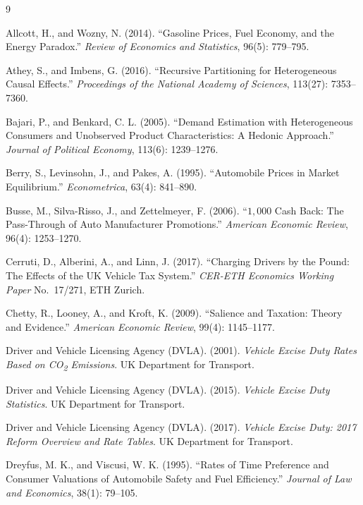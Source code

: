 \documentclass[12pt, a4paper]{article}
\begin{document}
\begin{thebibliography}{9}

Allcott, H., and Wozny, N. (2014).
``Gasoline Prices, Fuel Economy, and the Energy Paradox.''
\textit{Review of Economics and Statistics}, 96(5): 779--795.

Athey, S., and Imbens, G. (2016).
``Recursive Partitioning for Heterogeneous Causal Effects.''
\textit{Proceedings of the National Academy of Sciences}, 113(27): 7353--7360.

Bajari, P., and Benkard, C. L. (2005).
``Demand Estimation with Heterogeneous Consumers and Unobserved Product Characteristics: A Hedonic Approach.''
\textit{Journal of Political Economy}, 113(6): 1239--1276.

Berry, S., Levinsohn, J., and Pakes, A. (1995).
``Automobile Prices in Market Equilibrium.''
\textit{Econometrica}, 63(4): 841--890.

Busse, M., Silva-Risso, J., and Zettelmeyer, F. (2006).
``$1{,}000$ Cash Back: The Pass-Through of Auto Manufacturer Promotions.''
\textit{American Economic Review}, 96(4): 1253--1270.

Cerruti, D., Alberini, A., and Linn, J. (2017).
``Charging Drivers by the Pound: The Effects of the UK Vehicle Tax System.''
\textit{CER-ETH Economics Working Paper} No.~17/271, ETH Zurich.

Chetty, R., Looney, A., and Kroft, K. (2009).
``Salience and Taxation: Theory and Evidence.''
\textit{American Economic Review}, 99(4): 1145--1177.

Driver and Vehicle Licensing Agency (DVLA). (2001).
\textit{Vehicle Excise Duty Rates Based on CO\textsubscript{2} Emissions}.
UK Department for Transport.

Driver and Vehicle Licensing Agency (DVLA). (2015).
\textit{Vehicle Excise Duty Statistics}.
UK Department for Transport.

Driver and Vehicle Licensing Agency (DVLA). (2017).
\textit{Vehicle Excise Duty: 2017 Reform Overview and Rate Tables}.
UK Department for Transport.

Dreyfus, M. K., and Viscusi, W. K. (1995).
``Rates of Time Preference and Consumer Valuations of Automobile Safety and Fuel Efficiency.''
\textit{Journal of Law and Economics}, 38(1): 79--105.


\end{thebibliography}
\end{document}
